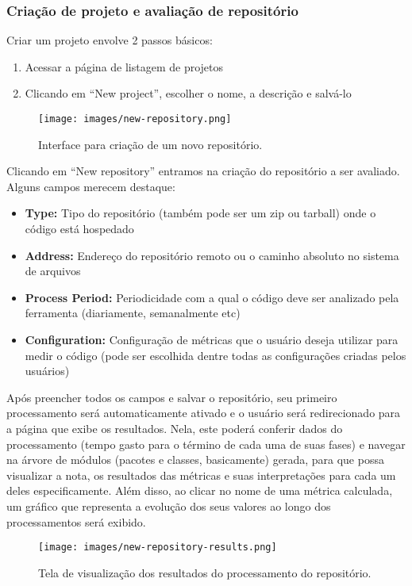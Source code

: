 \documentclass[12pt]{article}
\begin{document}
    \subsubsection{Criação de projeto e avaliação de repositório}
    Criar um projeto envolve 2 passos básicos:
    \begin{enumerate}
      \item Acessar a página de listagem de projetos
      \item Clicando em ``New project'', escolher o nome, a descrição e salvá-lo
    \end{enumerate}
    \begin{figure}[H]
      \centering
      \texttt{[image: images/new-repository.png]}
      \caption{Interface para criação de um novo repositório.}
      \label{fig:choose-metric}
    \end{figure}

    Clicando em ``New repository'' entramos na criação do repositório a ser avaliado. Alguns campos merecem destaque:
    \begin{itemize}
      \item\textbf{Type:} Tipo do repositório (também pode ser um zip ou tarball) onde o código está hospedado
      \item\textbf{Address:} Endereço do repositório remoto ou o caminho absoluto no sistema de arquivos
      \item\textbf{Process Period:} Periodicidade com a qual o código deve ser analizado pela ferramenta (diariamente, semanalmente etc)
      \item\textbf{Configuration:} Configuração de métricas que o usuário deseja utilizar para medir o código (pode ser escolhida dentre todas as configurações criadas pelos usuários)
    \end{itemize}
    Após preencher todos os campos e salvar o repositório, seu primeiro processamento será automaticamente ativado e o usuário será redirecionado para a página que exibe os resultados. Nela, este poderá conferir dados do processamento (tempo gasto para o término de cada uma de suas fases) e navegar na árvore de módulos (pacotes e classes, basicamente) gerada, para que possa visualizar a nota, os resultados das métricas e suas interpretações para cada um deles especificamente. Além disso, ao clicar no nome de uma métrica calculada, um gráfico que representa a evolução dos seus valores ao longo dos processamentos será exibido.

    \begin{figure}[H]
      \centering
      \texttt{[image: images/new-repository-results.png]}
      \caption{Tela de visualização dos resultados do processamento do repositório.}
      \label{fig:choose-metric}
    \end{figure}
\end{document}
